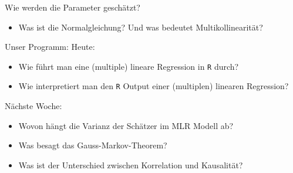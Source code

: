\documentclass[
  ignorenonframetext,
  t,
  aspectratio=169]{beamer}
\providecommand{\tightlist}{%
  \setlength{\itemsep}{0pt}\setlength{\parskip}{0pt}}
\begin{document}
\begin{frame}{Wie werden die Parameter geschätzt?}
\protect\hypertarget{wie-werden-die-parameter-geschuxe4tzt}{}
\begin{itemize}
\tightlist
\item
  Was ist die Normalgleichung? Und was bedeutet Multikollinearität?
\end{itemize}
\end{frame}

\begin{frame}{Unser Programm:}
\protect\hypertarget{unser-programm}{}
Heute:

\begin{itemize}
\tightlist
\item
  Wie führt man eine (multiple) lineare Regression in \texttt{R} durch?
\item
  Wie interpretiert man den \texttt{R} Output einer (multiplen) linearen
  Regression?
\end{itemize}

Nächste Woche:

\begin{itemize}
\tightlist
\item
  Wovon hängt die Varianz der Schätzer im MLR Modell ab?
\item
  Was besagt das Gauss-Markov-Theorem?
\item
  Was ist der Unterschied zwischen Korrelation und Kausalität?
\end{itemize}
\end{frame}
\end{document}
